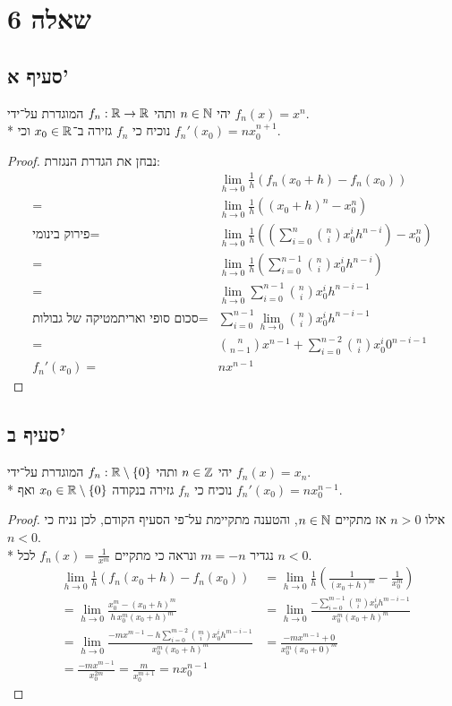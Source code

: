 \section{שאלה 6}
\subsection{סעיף א'}
יהי $n \in \mathbb{N}$ ותהי $f_n : \mathbb{R} \to \mathbb{R}$ המוגדרת על־ידי $f_n(x) = x^n$. \\*
נוכיח כי $f_n$ גזירה ב־$x_0 \in \mathbb{R}$ וכי $f_n'(x_0) = nx_0^{n + 1}$.
\begin{proof}
	נבחן את הגדרת הנגזרת:
	\begin{align*}
		& \lim_{h \to 0} \frac{1}{h} \left( f_n(x_0 + h) - f_n(x_0) \right) \\
		= & \lim_{h \to 0} \frac{1}{h} \left( {(x_0 + h)}^n - x_0^n \right) \\
		\text{פירוק בינומי} = & \lim_{h \to 0} \frac{1}{h} \left( \left(\sum_{i = 0}^{n} \binom{n}{i} x_0^i  h^{n - i}\right) - x_0^n \right) \\
		= & \lim_{h \to 0} \frac{1}{h}  \left(\sum_{i = 0}^{n - 1} \binom{n}{i} x_0^i  h^{n - i}\right)  \\
		= & \lim_{h \to 0} \sum_{i = 0}^{n - 1} \binom{n}{i} x_0^i  h^{n - i - 1}  \\
		\text{סכום סופי ואריתמטיקה של גבולות} = & \sum_{i = 0}^{n - 1} \lim_{h \to 0} \binom{n}{i} x_0^i  h^{n - i - 1}  \\
		= & \binom{n}{n - 1} x^{n - 1} + \sum_{i = 0}^{n - 2} \binom{n}{i} x_0^i  0^{n - i - 1}  \\
		f_n'(x_0) = & n x^{n - 1}
	\end{align*}
\end{proof}

\subsection{סעיף ב'}
יהי $n \in \mathbb{Z}$ ותהי $f_n : \mathbb{R} \setminus \{0\}$ המוגדרת על־ידי $f_n(x) = x_n$. \\*
נוכיח כי $f_n$ גזירה בנקודה $x_0 \in \mathbb{R} \setminus \{0\}$ ואף $f_n'(x_0) = nx_0^{n - 1}$.
\begin{proof}
	אילו $n > 0$ אז מתקיים $n \in \mathbb{N}$, והטענה מתקיימת על־פי הסעיף הקודם, לכן נניח כי $n < 0$. \\*
	נגדיר $m = -n$ ונראה כי מתקיים $f_n(x) = \frac{1}{x^m}$ לכל $n < 0$.
	\begin{align*}
		& \lim_{h \to 0} \frac{1}{h} \left( f_n(x_0 + h) - f_n(x_0) \right)
		& = \lim_{h \to 0} \frac{1}{h} \left( \frac{1}{{(x_0 + h)}^m} - \frac{1}{x_0^m} \right) \\
		& = \lim_{h \to 0} \frac{x_0^m - {(x_0 + h)}^m}{h \, x_0^m {(x_0 + h)}^m}
		& = \lim_{h \to 0} \frac{-\sum_{i = 0}^{m - 1} \binom{m}{i} x_0^i  h^{m - i - 1}}{x_0^m {(x_0 + h)}^m} \\
		& = \lim_{h \to 0} \frac{-m x^{m - 1} - h \sum_{i = 0}^{m - 2} \binom{m}{i} x_0^i  h^{m - i - 1}}{x_0^m {(x_0 + h)}^m}
		& = \frac{-m x^{m - 1} + 0}{x_0^m {(x_0 + 0)}^m} \\
		& = \frac{-m x^{m - 1}}{x_0^{2m}} = \frac{m}{x_0^{m + 1}} = nx_0^{n - 1}
	\end{align*}
\end{proof}

